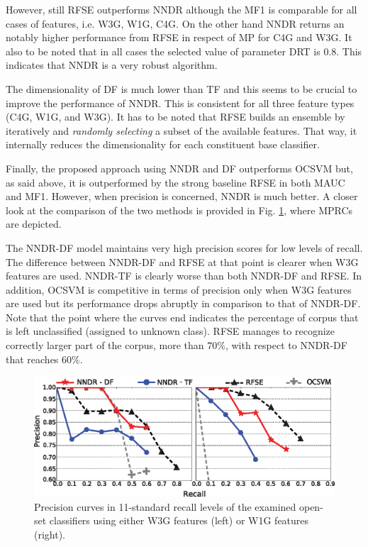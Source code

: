 However, still RFSE outperforms NNDR although the MF1 is comparable for all cases of features, i.e. W3G, W1G, C4G. On the other hand NNDR returns an notably higher performance from RFSE in respect of MP for C4G and W3G. It also to be noted that in all cases the selected value of parameter DRT is 0.8. This indicates that NNDR is a very robust algorithm.

The dimensionality of DF is much lower than TF and this seems to be crucial to improve the performance of NNDR. This is consistent for all three feature types (C4G, W1G, and W3G). It has to be noted that RFSE builds an ensemble by iteratively and \textit{randomly selecting} a subset of the available features. That way, it internally reduces the dimensionality for each constituent base classifier. 

Finally, the proposed approach using NNDR and DF outperforms OCSVM but, as said above, it is outperformed by the strong baseline RFSE in both MAUC and MF1. However, when precision is concerned, NNDR is much better. A closer look at  the comparison of the two methods is provided in Fig. \ref{chap:word_embeddings:fig:NNDR_W3G_Best_RFSE_Baseline}, where MPRCs are depicted. 

The NNDR-DF model maintains very high precision scores for low levels of recall. The difference between NNDR-DF and RFSE at that point is clearer when W3G features are used. NNDR-TF is clearly worse than both NNDR-DF and RFSE. In addition, OCSVM is competitive in terms of precision only when W3G features are used but its performance drops abruptly in comparison to that of NNDR-DF. Note that the point where the curves end indicates the percentage of corpus that is left unclassified (assigned to unknown class). RFSE manages to recognize correctly larger part of the corpus, more than $70\%$, with respect to NNDR-DF that reaches $60\%$. 


\begin{figure}[t]
\begin{center}
    \includegraphics[scale=0.95]{Figures/NNDR_W3G-W1G_Best_RFSE-OCSVM-Baselines.eps}
	\caption{Precision curves in 11-standard recall levels of the examined open-set classifiers using either W3G features (left) or W1G features (right).}
	\label{chap:word_embeddings:fig:NNDR_W3G_Best_RFSE_Baseline}
	\end{center}
\end{figure}

